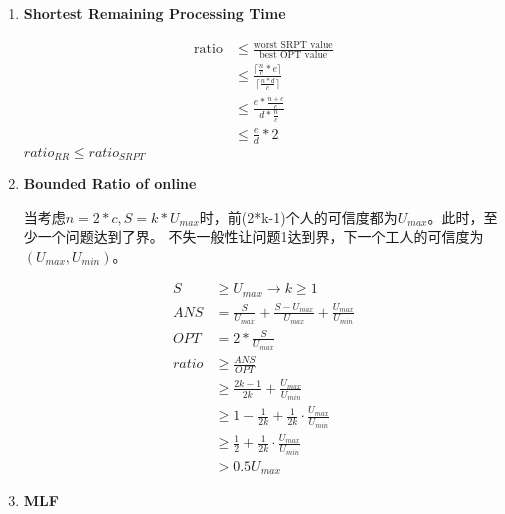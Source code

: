 \documentclass[UTF8]{ctexart}
\newcommand{\Emph}{\textbf}
\begin{document}
\begin{enumerate}[(1)]
    \newpage
    \item \Emph{Shortest Remaining Processing Time}

    \begin{align*}
        \text{ratio} &\le \frac{\text{worst SRPT value}}{\text{best OPT value}} \\
                     &\le \frac{\lceil \frac{n}{c} * e \rceil}{\lceil \frac{n*d}{c} \rceil} \\
					 &\le \frac{e * \frac{n+c}{c}}{d * \frac{n}{c}} \\
					 &\le \frac{e}{d} * 2
    \end{align*}
	$ratio_{RR} \le ratio_{SRPT}$
	
	\newpage
	\item \Emph{Bounded Ratio of online}

	当考虑$n=2*c, S=k*U_{max}$时，前(2*k-1)个人的可信度都为$U_{max}$。此时，至少一个问题达到了界。
	不失一般性让问题1达到界，下一个工人的可信度为$(U_{max}, U_{min})$。
	
	\begin{align*}
		S   &\ge U_{max} \rightarrow k \ge 1 \\
		ANS &=\frac{S}{U_{max}} + \frac{S-U_{max}}{U_{max}} + \frac{U_{max}}{U_{min}} \\
		OPT &= 2*\frac{S}{U_{max}} \\
		ratio  &\ge \frac{ANS}{OPT} \\
			   &\ge \frac{2k-1}{2k} + \frac{U_{max}}{U_{min}} \\
			   &\ge 1 - \frac{1}{2k} + \frac{1}{2k} \cdot \frac{U_{max}}{U_{min}} \\
			   &\ge \frac{1}{2} + \frac{1}{2k} \cdot \frac{U_{max}}{U_{min}} \\
			   &> 0.5U_{max}
	\end{align*}
	
	\newpage
    \item \Emph{MLF}
	
\end{enumerate}	
\end{document}

